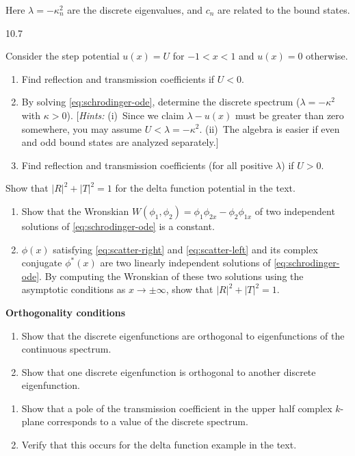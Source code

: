 Here $\lambda = -\kappa_n^2$ are the discrete eigenvalues, and $c_n$ are related to the bound states.

\begin{exercises}{10.7}
\item Consider the step potential $u(x) = U$ for $-1 < x < 1$ and $u(x) = 0$ otherwise.
\begin{enumerate}
\item[(a)] Find reflection and transmission coefficients if $U < 0$.
\item[(b)] By solving \eqref{eq:schrodinger-ode}, determine the discrete spectrum ($\lambda = -\kappa^2$ with $\kappa > 0$).  [\textit{Hints:} (i)~Since we claim $\lambda - u(x)$ must be greater than zero somewhere, you may assume $U < \lambda = -\kappa^2$.  (ii)~The algebra is easier if even and odd bound states are analyzed separately.]
\item[(c)] Find reflection and transmission coefficients (for all positive $\lambda$) if $U > 0$.
\end{enumerate}

\item Show that $|R|^2 + |T|^2 = 1$ for the delta function potential in the text.

\item
\begin{enumerate}
\item[(a)] Show that the Wronskian $W(\phi_1,\phi_2) = \phi_1\phi_{2x} - \phi_2\phi_{1x}$ of two independent solutions of \eqref{eq:schrodinger-ode} is a constant.
\item[(b)] $\phi(x)$ satisfying \eqref{eq:scatter-right} and \eqref{eq:scatter-left} and its complex conjugate $\phi^*(x)$ are two linearly independent solutions of \eqref{eq:schrodinger-ode}.  By computing the Wronskian of these two solutions using the asymptotic conditions as $x \to \pm\infty$, show that $|R|^2 + |T|^2 = 1$.
\end{enumerate}

\item \textbf{Orthogonality conditions}
\begin{enumerate}
\item[(a)] Show that the discrete eigenfunctions are orthogonal to eigenfunctions of the continuous spectrum.
\item[(b)] Show that one discrete eigenfunction is orthogonal to another discrete eigenfunction.
\end{enumerate}

\item
\begin{enumerate}
\item[(a)] Show that a pole of the transmission coefficient in the upper half complex $k$-plane corresponds to a value of the discrete spectrum.
\item[(b)] Verify that this occurs for the delta function example in the text.
\end{enumerate}


\end{exercises}
